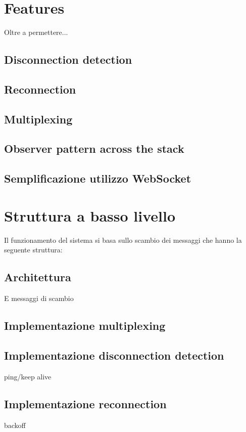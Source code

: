 \documentclass[12pt,a4paper,openright,twoside]{report}
\begin{document}
\section{Features}\label{sec_features}
Oltre a permettere...
\subsection{Disconnection detection}

\subsection{Reconnection}

\subsection{Multiplexing}

\subsection{Observer pattern across the stack}

\subsection{Semplificazione utilizzo WebSocket}

\section{Struttura a basso livello}\label{sec_struttura_basso_livello}
Il funzionamento del sistema si basa sullo scambio dei messaggi che hanno la seguente struttura:
\subsection{Architettura}
E messaggi di scambio

\subsection{Implementazione multiplexing}

\subsection{Implementazione disconnection detection}
ping/keep alive
\subsection{Implementazione reconnection}
backoff
\end{document}
